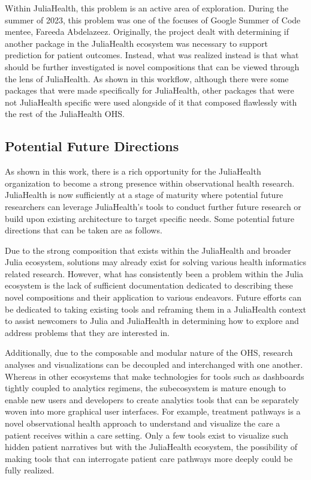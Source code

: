 \documentclass{juliacon}
\begin{document}
Within JuliaHealth, this problem is an active area of exploration.
During the summer of 2023, this problem was one of the focuses of Google Summer of Code mentee, Fareeda Abdelazeez.
Originally, the project dealt with determining if another package in the JuliaHealth ecosystem was necessary to support prediction for patient outcomes.
Instead, what was realized instead is that what should be further investigated is novel compositions that can be viewed through the lens of JuliaHealth.
As shown in this workflow, although there were some packages that were made specifically for JuliaHealth, other packages that were not JuliaHealth specific were used alongside of it that composed flawlessly with the rest of the JuliaHealth OHS.

\subsection{Potential Future Directions}

As shown in this work, there is a rich opportunity for the JuliaHealth organization to become a strong presence within observational health research. 
JuliaHealth is now sufficiently at a stage of maturity where potential future researchers can leverage JuliaHealth's tools to conduct further future research or build upon existing architecture to target specific needs.
Some potential future directions that can be taken are as follows.

Due to the strong composition that exists within the JuliaHealth and broader Julia ecosystem, solutions may already exist for solving various health informatics related research.
However, what has consistently been a problem within the Julia ecosystem is the lack of sufficient documentation dedicated to describing these novel compositions and their application to various endeavors.
Future efforts can be dedicated to taking existing tools and reframing them in a JuliaHealth context to assist newcomers to Julia and JuliaHealth in determining how to explore and address problems that they are interested in.

Additionally, due to the composable and modular nature of the OHS, research analyses and visualizations can be decoupled and interchanged with one another.
Whereas in other ecosystems that make technologies for tools such as dashboards tightly coupled to analytics regimens, the subecosystem is mature enough to enable new users and developers to create analytics tools that can be separately woven into more graphical user interfaces.
For example, treatment pathways is a novel observational health approach to understand and visualize the care a patient receives within a care setting.
Only a few tools exist to visualize such hidden patient narratives but with the JuliaHealth ecosystem, the possibility of making tools that can interrogate patient care pathways more deeply could be fully realized.
\end{document}
